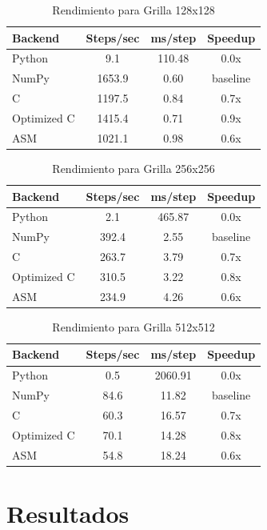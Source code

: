 \documentclass[a4paper]{article}
\begin{document}
\begin{table}[h]
\centering
\caption{Rendimiento para Grilla 128x128}
\begin{tabular}{@{}lccc@{}}
\toprule
Backend & Steps/sec & ms/step & Speedup \\
\midrule
Python & 9.1 & 110.48 & 0.0x \\
NumPy & 1653.9 & 0.60 & baseline \\
C & 1197.5 & 0.84 & 0.7x \\
Optimized C & 1415.4 & 0.71 & 0.9x \\
ASM & 1021.1 & 0.98 & 0.6x \\
\bottomrule
\end{tabular}
\label{tab:perf_128x128}
\end{table}

\begin{table}[h]
\centering
\caption{Rendimiento para Grilla 256x256}
\begin{tabular}{@{}lccc@{}}
\toprule
Backend & Steps/sec & ms/step & Speedup \\
\midrule
Python & 2.1 & 465.87 & 0.0x \\
NumPy & 392.4 & 2.55 & baseline \\
C & 263.7 & 3.79 & 0.7x \\
Optimized C & 310.5 & 3.22 & 0.8x \\
ASM & 234.9 & 4.26 & 0.6x \\
\bottomrule
\end{tabular}
\label{tab:perf_256x256}
\end{table}

\begin{table}[h]
\centering
\caption{Rendimiento para Grilla 512x512}
\begin{tabular}{@{}lccc@{}}
\toprule
Backend & Steps/sec & ms/step & Speedup \\
\midrule
Python & 0.5 & 2060.91 & 0.0x \\
NumPy & 84.6 & 11.82 & baseline \\
C & 60.3 & 16.57 & 0.7x \\
Optimized C & 70.1 & 14.28 & 0.8x \\
ASM & 54.8 & 18.24 & 0.6x \\
\bottomrule
\end{tabular}
\label{tab:perf_512x512}
\end{table}

\section{Resultados}
\end{document}
